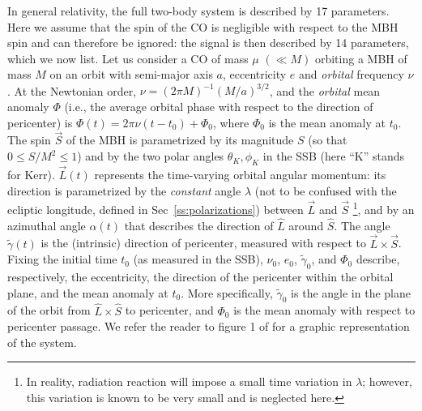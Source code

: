 \documentclass{iopart}
\begin{document}
In general relativity, the full two-body system is described by 17 parameters. Here we assume that the spin of the CO is negligible with respect to the MBH spin and can therefore be ignored: the signal is then described by 14 parameters, which we now list. Let us consider a CO of mass $\mu$ $(\ll M)$ orbiting a MBH of mass $M$ on an orbit with semi-major axis $a$, eccentricity $e$ and \emph{orbital} frequency $\nu$. At the Newtonian order,  $\nu = (2\pi M)^{-1} (M/a)^{3/2}$, and the \emph{orbital} mean anomaly $\Phi$ (i.e., the average orbital phase with respect to the direction of pericenter) is $\Phi(t) = 2\pi\nu (t-t_0) +\Phi_0$, where  $\Phi_0$ is the mean anomaly at $t_0$. The spin $\vec S$ of the MBH is parametrized by its magnitude $S$ (so that $0 \le S/M^2 \le 1$) and by the two polar angles $\theta_K,\phi_K$ in the SSB (here ``K'' stands for Kerr). $\vec L(t)$ represents the time-varying orbital angular momentum: its direction is parametrized by the \emph{constant} angle $\lambda$ (not to be confused with the ecliptic longitude, defined in Sec~\ref{ss:polarizations}) between $\vec L$ and $\vec S$%
\footnote{In reality, radiation reaction will impose a small time variation in $\lambda$; however, this variation is known to be very small \cite{scott1} and is neglected here.}, and by an azimuthal angle $\alpha(t)$ that describes the direction of $\hat L$ around $\hat S$. The angle $\tilde\gamma(t)$ is the (intrinsic) direction of pericenter, measured with respect to $\vec L\times\vec S$. Fixing the initial time $t_0$ (as measured in the SSB), $\nu_0$, $e_0$, $\tilde\gamma_0$, and $\Phi_0$ describe, respectively, the eccentricity, the direction of the pericenter within the orbital plane, and the mean anomaly at $t_0$. More specifically, $\tilde\gamma_0$ is the angle in the plane of the orbit from $\hat L \times \hat S$ to pericenter, and $\Phi_0$ is the mean anomaly with respect to pericenter passage. We refer the reader to figure 1 of \cite{BC} for a graphic representation of the system.
\end{document}
